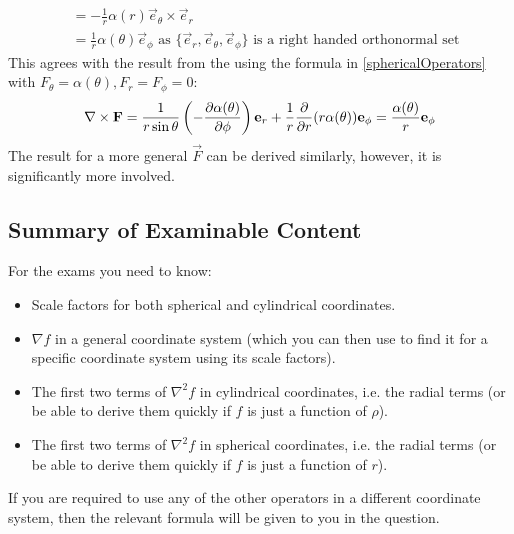 \documentclass[../main.tex]{subfiles}
\begin{document}
\begin{example}
\begin{align*}
                          &= -\frac{1}{r} \alpha(r) \vec{e}_\theta \times \vec{e}_r \\
                          &= \frac{1}{r}\alpha(\theta)\vec{e}_\phi \text{ as $\{\vec{e}_r, \vec{e}_\theta, \vec{e}_\phi\}$ is a right handed orthonormal set}
  \end{align*}
  This agrees with the result from the using the formula in \cref{sphericalOperators} with $F_\theta = \alpha(\theta), F_r = F_\phi = 0$:
  \[
    \nabla \times \vec{F} = \frac{1}{r\sin \theta} \left(- \pderiv{\alpha(\theta)}{\phi}\right)\vec{e}_r + \frac{1}{r} \pderiv{}{r}(r \alpha(\theta))\vec{e}_\phi = \frac{\alpha(\theta)}{r}\vec{e}_\phi
  \]
  The result for a more general $\vec{F}$ can be derived similarly, however, it is significantly more involved.
\end{example}
\subsection{Summary of Examinable Content}
For the exams you need to know:
\begin{itemize}
  \item Scale factors for both spherical and cylindrical coordinates.
  \item $\nabla f$ in a general coordinate system (which you can then use to find it for a specific coordinate system using its scale factors).
  \item The first two terms of $\nabla^2 f$ in cylindrical coordinates, i.e. the radial terms (or be able to derive them quickly if $f$ is just a function of $\rho$).
  \item The first two terms of $\nabla^2 f$ in spherical coordinates, i.e. the radial terms (or be able to derive them quickly if $f$ is just a function of $r$).
\end{itemize}
If you are required to use any of the other operators in a different coordinate system, then the relevant formula will be given to you in the question.
\end{document}
